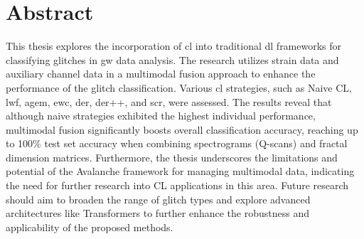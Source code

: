 \section*{Abstract}
This thesis explores the incorporation of \acrfull{cl} into traditional \acrfull{dl} frameworks for classifying glitches in \acrfull{gw} data analysis. The research utilizes strain data and auxiliary channel data in a multimodal fusion approach to enhance the performance of the glitch classification. Various \acrlong{cl} strategies, such as Naive CL, \acrfull{lwf}, \acrfull{agem}, \acrfull{ewc}, \acrfull{der}, \acrfull{der++}, and \acrfull{scr}, were assessed. The results reveal that although naive strategies exhibited the highest individual performance, multimodal fusion significantly boosts overall classification accuracy, reaching up to 100\% test set accuracy when combining spectrograms (Q-scans) and fractal dimension matrices. Furthermore, the thesis underscores the limitations and potential of the Avalanche framework for managing multimodal data, indicating the need for further research into CL applications in this area. Future research should aim to broaden the range of glitch types and explore advanced architectures like Transformers to further enhance the robustness and applicability of the proposed methods.
